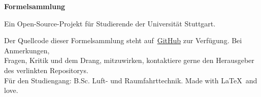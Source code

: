 \thispagestyle{empty}

\centering

\vspace*{88mm}
\begin{minipage}[c][30mm][c]{\textwidth}
    \centering
    \Huge\thetitle
\end{minipage}

\vspace{30mm}
{\Huge\textbf{Formelsammlung}}

\vspace{98mm}
{\large Ein Open-Source-Projekt für Studierende der Universität Stuttgart.}

\vspace*{3mm}
\footnotesize Der Quellcode dieser Formelsammlung steht auf~\href{https://github.com/m4zeRobot/Project-FoSa}{GitHub} zur Verfügung. Bei Anmerkungen,\\
Fragen, Kritik und dem Drang, mitzuwirken, kontaktiere gerne den Herausgeber des verlinkten Repositorys.\\
Für den Studiengang: B.Sc. Luft- und Raumfahrttechnik. Made with \LaTeX~and love.
\newpage